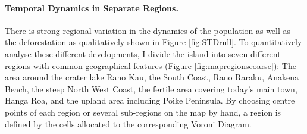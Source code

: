 \paragraph{Temporal Dynamics in Separate Regions.}
There is strong regional variation in the dynamics of the population as well as the deforestation as qualitatively shown in Figure \ref{fig:STDrull}. 
To quantitatively analyse these different developments, I divide the island into seven different regions with common geographical features (Figure \ref{fig:mapregionscoarse}): The area around the crater lake Rano Kau, the South Coast, Rano Raraku, Anakena Beach, the steep North West Coast, the fertile area covering today's main town, Hanga Roa, and the upland area including Poike Peninsula. 
By choosing centre points of each region or several sub-regions on the map by hand, a region is defined by the cells allocated to the corresponding Voroni Diagram.

